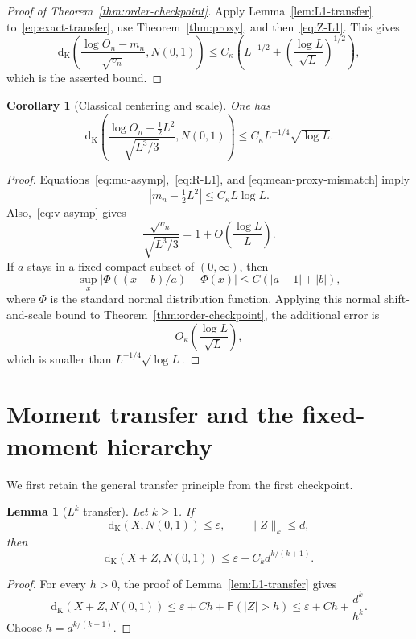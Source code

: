 \documentclass[11pt]{article}
\newtheorem{lemma}[theorem]{Lemma}
\newtheorem{corollary}[theorem]{Corollary}
\theoremstyle{remark}
\newcommand{\Pp}{\mathbb P}
\newcommand{\Kol}{\mathrm d_{\mathrm K}}
\begin{document}
\begin{proof}[Proof of Theorem~\ref{thm:order-checkpoint}]
Apply Lemma~\ref{lem:L1-transfer} to~\eqref{eq:exact-transfer}, use
Theorem~\ref{thm:proxy}, and then~\eqref{eq:Z-L1}.  This gives
\[
 \Kol\!\left(
 \frac{\log O_n-m_n}{\sqrt{v_n}},N(0,1)\right)
 \le C_\kappa\left(
 L^{-1/2}+\left(\frac{\log L}{\sqrt L}\right)^{1/2}
 \right),
\]
which is the asserted bound.
\end{proof}

\begin{corollary}[Classical centering and scale]
\label{cor:classical}
One has
\[
 \Kol\!\left(
 \frac{\log O_n-\frac12L^2}{\sqrt{L^3/3}},N(0,1)\right)
 \le C_\kappa L^{-1/4}\sqrt{\log L}.
\]
\end{corollary}

\begin{proof}
Equations~\eqref{eq:mu-asymp},~\eqref{eq:R-L1}, and
\eqref{eq:mean-proxy-mismatch} imply
\[
 |m_n-\tfrac12L^2|\le C_\kappa L\log L.
\]
Also,~\eqref{eq:v-asymp} gives
\[
 \frac{\sqrt{v_n}}{\sqrt{L^3/3}}=1+O\left(\frac{\log L}{L}\right).
\]
If $a$ stays in a fixed compact subset of $(0,\infty)$, then
\[
 \sup_x|\Phi((x-b)/a)-\Phi(x)|
 \le C(|a-1|+|b|),
\]
where $\Phi$ is the standard normal distribution function.  Applying this
normal shift-and-scale bound to Theorem~\ref{thm:order-checkpoint}, the
additional error is
\[
 O_\kappa\left(\frac{\log L}{\sqrt L}\right),
\]
which is smaller than $L^{-1/4}\sqrt{\log L}$.
\end{proof}

\section{Moment transfer and the fixed-moment hierarchy}

We first retain the general transfer principle from the first checkpoint.

\begin{lemma}[$L^k$ transfer]
\label{lem:Lk-transfer}
Let $k\ge1$.  If
\[
 \Kol(X,N(0,1))\le\varepsilon,
 \qquad
 \|Z\|_k\le d,
\]
then
\begin{equation}
\label{eq:Lk-transfer}
 \Kol(X+Z,N(0,1))
 \le\varepsilon+C_k d^{k/(k+1)}.
\end{equation}
\end{lemma}

\begin{proof}
For every $h>0$, the proof of Lemma~\ref{lem:L1-transfer} gives
\[
 \Kol(X+Z,N(0,1))
 \le\varepsilon+Ch+\Pp(|Z|>h)
 \le\varepsilon+Ch+\frac{d^k}{h^k}.
\]
Choose $h=d^{k/(k+1)}$.
\end{proof}
\end{document}
